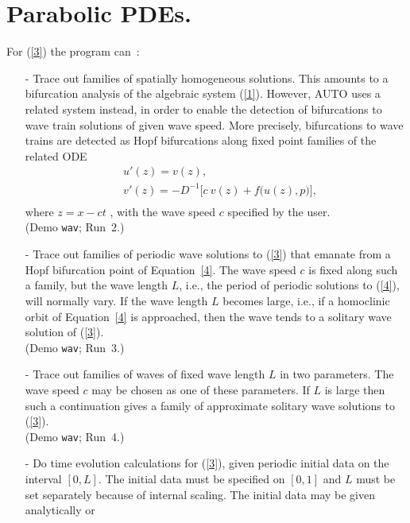\documentclass[12pt]{report}
\begin{document}
\section{ Parabolic PDEs.} \label{sec:Parabolic_PDEs}
For (\ref{3}) the program can~:~
 
\begin{itemize}
\item[-]
  Trace out families of spatially homogeneous solutions.
  This amounts to a bifurcation analysis of the algebraic
  system (\ref{1}). However, {\cal AUTO} uses a related system instead,
  in order to enable the detection of bifurcations to wave train
  solutions of given wave speed. More precisely, bifurcations
  to wave trains are detected as Hopf bifurcations along fixed
  point families of the related ODE
  \begin{equation} \label{4} \begin{array}{cl}
  & u'(z) = v(z) ,\\
  & v'(z) =-D^{-1}  \bigl[ c~v(z) + f\bigl( u(z) , p \bigr) \bigr], \\
  \end{array} \end{equation}
  where $z = x - ct$ , with the wave speed $c$ specified by the user.\\
  (Demo {\tt wav}; Run~2.) 
\item[-]
  Trace out families of periodic wave solutions to (\ref{3}) that emanate
  from a Hopf bifurcation point of Equation~\ref{4}.
  The wave speed $c$ is  fixed along such a family, but
  the wave length $L$, i.e., the period of periodic solutions 
  to (\ref{4}),
  will normally vary. If the wave length $L$ becomes large,
  i.e., if a homoclinic orbit of Equation~\ref{4} is approached,
  then the wave tends to a solitary wave solution of (\ref{3}). \\
  (Demo {\tt wav}; Run~3.) 
\item[-]
  Trace out families of waves of fixed wave length $L$ in two parameters. 
  The wave speed $c$ may be chosen as one of these parameters.
  If $L$ is large then such a continuation gives a family
  of approximate solitary wave solutions to (\ref{3}).\\
  (Demo {\tt wav}; Run~4.) 
\item[-]
  Do time evolution calculations for (\ref{3}), given periodic
  initial data on the interval $[0,L]$.
  The initial data must be specified on $[0,1]$ and
  $L$ must be set separately because of internal scaling.
  The initial data may be given analytically or

\end{itemize}
\end{document}
